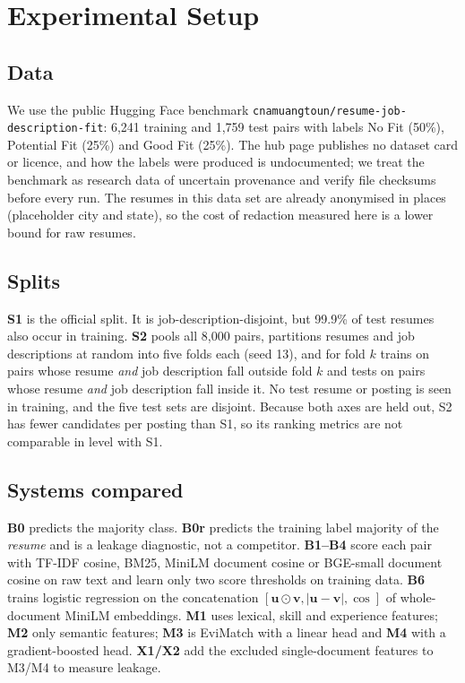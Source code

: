 \section{Experimental Setup}\label{sec:setup}
\subsection{Data}
We use the public Hugging Face benchmark \texttt{cnamuangtoun/resume-job-description-fit}: 6{,}241
training and 1{,}759 test pairs with labels No Fit (50\%), Potential Fit (25\%) and Good Fit (25\%). The
hub page publishes no dataset card or licence, and how the labels were produced is undocumented; we treat the
benchmark as research data of uncertain provenance and verify file checksums before every run. The
resumes in this data set are already anonymised in places (placeholder city and state), so the cost of
redaction measured here is a lower bound for raw resumes.

\subsection{Splits}
\textbf{S1} is the official split. It is job-description-disjoint, but 99.9\% of test resumes also occur in
training. \textbf{S2} pools all 8{,}000 pairs, partitions resumes and job descriptions at random into five
folds each (seed 13), and for fold $k$ trains on pairs whose resume \emph{and} job description fall outside
fold $k$ and tests on pairs whose resume \emph{and} job description fall inside it. No test resume or posting is
seen in training, and the five test sets are disjoint. Because both axes are held out, S2 has fewer
candidates per posting than S1, so its ranking metrics are not comparable in level with S1.

\subsection{Systems compared}
\textbf{B0} predicts the majority class. \textbf{B0r} predicts the training label majority of the
\emph{resume} and is a leakage diagnostic, not a competitor. \textbf{B1--B4} score each pair with TF-IDF
cosine, BM25, MiniLM \cite{reimers2019sbert,wang2020minilm} document cosine or BGE-small document cosine
\cite{xiao2024cpack} on raw text and learn only two score thresholds on training data. \textbf{B6} trains
logistic regression on the concatenation $[\mathbf u\odot\mathbf v,|\mathbf u-\mathbf v|,\cos]$ of whole-document MiniLM
embeddings. \textbf{M1} uses lexical, skill and experience features; \textbf{M2} only semantic features;
\textbf{M3} is EviMatch with a linear head and \textbf{M4} with a gradient-boosted head. \textbf{X1/X2} add the
excluded single-document features to M3/M4 to measure leakage.


